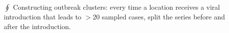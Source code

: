 \documentclass[portrait,a0paper,fontscale=0.3085]{baposter}
\begin{document}
\begin{poster}
{\begin{itemize}[leftmargin=*]
 To use $C(t)$ values as a proxy for viral load and also consistent with the mutation (binary) predictor we standardise $C(t)$ by subtracting the mean and dividing by two standard deviations and flipping the sign.
 \item[$\oint$] Constructing outbreak clusters: every time a location receives a viral introduction that leads to $>$20 sampled cases, split the series before and after the introduction.
\end{itemize}
}
\end{poster}
\end{document}
